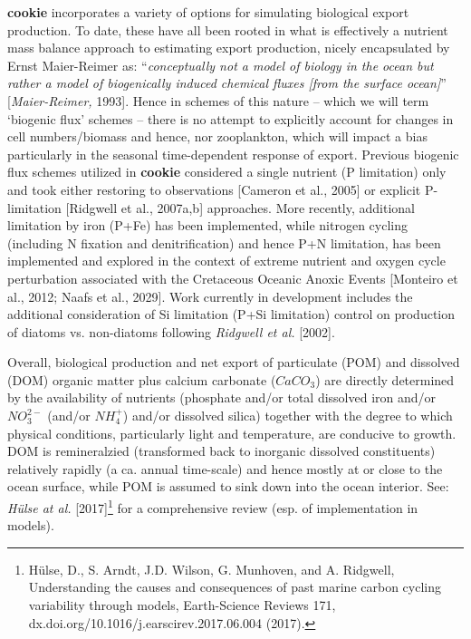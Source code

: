 \textbf{cookie} incorporates a variety of options for simulating biological export production. To date, these have all been rooted in what is effectively a nutrient mass balance approach to estimating export production, nicely encapsulated by Ernst Maier-Reimer as: “\textit{conceptually not a model of biology in the ocean but rather a model of biogenically induced chemical fluxes [from the surface ocean]}” [\textit{Maier-Reimer,} 1993]. Hence in schemes of this nature -- which we will term ‘biogenic  flux’ schemes --  there is no attempt to explicitly account for changes in cell numbers/biomass and hence, nor zooplankton, which will impact a bias particularly in the seasonal time-dependent response of export. Previous biogenic flux schemes utilized in  \textbf{cookie}  considered a single nutrient (P limitation) only and took either restoring to observations [Cameron et al., 2005] or explicit P-limitation [Ridgwell et al., 2007a,b] approaches. More recently, additional limitation by iron (P+Fe) has been implemented, while nitrogen cycling (including N fixation and denitrification) and hence P+N limitation, has been implemented and explored in the context of extreme nutrient and oxygen cycle perturbation associated with the Cretaceous Oceanic Anoxic Events [Monteiro et al., 2012; Naafs et al., 2029]. Work currently in development includes the additional consideration of Si limitation (P+Si limitation) control on production of diatoms vs. non-diatoms following \textit{Ridgwell et al.} [2002].

Overall, biological production and net export of particulate (POM) and dissolved (DOM) organic matter plus calcium carbonate (\(CaCO_{3}\)) are directly determined by the availability of nutrients (phosphate and/or total dissolved iron and/or \(NO^{2-}_{3}\) (and/or \(NH^{+}_{4}\)) and/or dissolved silica) together with the degree to which physical conditions, particularly light and temperature, are conducive to growth. DOM is remineralzied (transformed back to inorganic dissolved constituents) relatively rapidly (a ca. annual time-scale) and hence mostly at or close to the ocean surface, while POM is assumed to sink down into the ocean interior. See: \textit{Hülse at al.} [2017]\footnote{Hülse, D., S. Arndt, J.D. Wilson, G. Munhoven, and A. Ridgwell, Understanding the causes and consequences of past marine carbon cycling variability through models, Earth-Science Reviews 171, dx.doi.org/10.1016/j.earscirev.2017.06.004 (2017).} for a comprehensive review (esp. of implementation in models).

